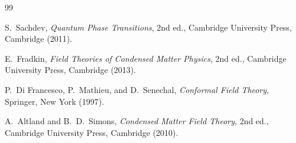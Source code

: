 \documentclass[12pt,openany]{book}
\theoremstyle{definition}
\theoremstyle{plain}
\begin{document}
\begin{thebibliography}{99}

S.~Sachdev,
\emph{Quantum Phase Transitions},
2nd ed., Cambridge University Press, Cambridge (2011).

E.~Fradkin,
\emph{Field Theories of Condensed Matter Physics},
2nd ed., Cambridge University Press, Cambridge (2013).

P.~Di Francesco, P.~Mathieu, and D.~Senechal,
\emph{Conformal Field Theory},
Springer, New York (1997).

A.~Altland and B.~D.~Simons,
\emph{Condensed Matter Field Theory},
2nd ed., Cambridge University Press, Cambridge (2010).

\end{thebibliography}
\end{document}
